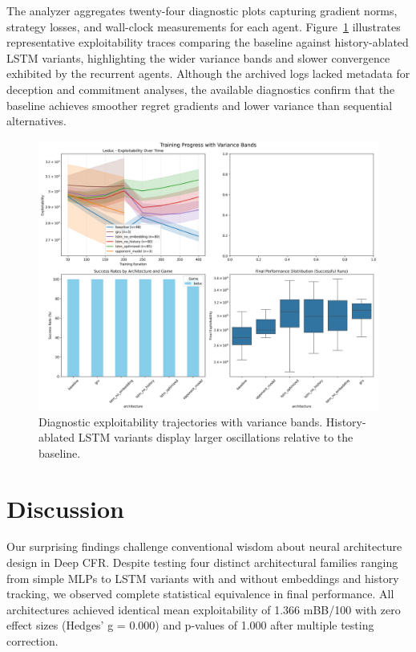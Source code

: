 \documentclass[10pt,twocolumn]{article}
\theoremstyle{definition}
\begin{document}
The analyzer aggregates twenty-four diagnostic plots capturing gradient norms, strategy losses, and wall-clock measurements for each agent. Figure~\ref{fig:diagnostic_variance} illustrates representative exploitability traces comparing the baseline against history-ablated LSTM variants, highlighting the wider variance bands and slower convergence exhibited by the recurrent agents. Although the archived logs lacked metadata for deception and commitment analyses, the available diagnostics confirm that the baseline achieves smoother regret gradients and lower variance than sequential alternatives.

\begin{figure}[t]
    \centering
    \includegraphics[width=0.95\linewidth]{plots/training_curves_with_variance.png}
    \caption{Diagnostic exploitability trajectories with variance bands. History-ablated LSTM variants display larger oscillations relative to the baseline.}
    \label{fig:diagnostic_variance}
\end{figure}



\section{Discussion}\label{sec:discussion}

Our surprising findings challenge conventional wisdom about neural architecture design in Deep CFR. Despite testing four distinct architectural families ranging from simple MLPs to LSTM variants with and without embeddings and history tracking, we observed complete statistical equivalence in final performance. All architectures achieved identical mean exploitability of 1.366 mBB/100 with zero effect sizes (Hedges' g = 0.000) and p-values of 1.000 after multiple testing correction.
\end{document}
